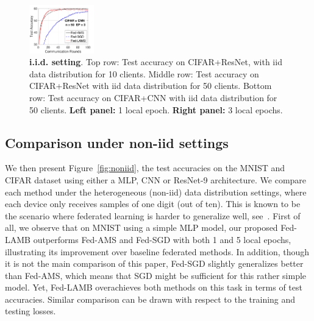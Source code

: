 \documentclass[twoside]{article}
\begin{document}
\begin{figure}[t]
\begin{center}
{        \includegraphics[width=0.25\textwidth]{new_figure/cifar_testerror_cnn_ep3_client50_iid1.pdf}

        }
    \end{center}
	\caption{\textbf{i.i.d. setting}. Top row: Test accuracy on CIFAR+ResNet, with iid data distribution for 10 clients. 
	{Middle row:} Test accuracy on CIFAR+ResNet with iid data distribution for 50 clients.
	{Bottom row:} Test accuracy on CIFAR+CNN with iid data distribution for 50 clients.
	\textbf{Left panel:} 1 local epoch. \textbf{Right panel:} 3 local epochs. 
	}
	\label{fig:iid}
\end{figure}



\subsection{Comparison under non-iid settings}

We then present Figure~\ref{fig:noniid}, the test accuracies on the MNIST and CIFAR dataset using either a MLP, CNN or ResNet-9 architecture. 
We compare each method under the heterogeneous (non-iid) data distribution settings, where each device only receives samples of one digit (out of ten). 
This is known to be the scenario where federated learning is harder to generalize well, see~\citet{mcmahan2017communication}. 
First of all, we observe that on MNIST using a simple MLP model, our proposed Fed-LAMB outperforms Fed-AMS and Fed-SGD with both 1 and 5 local epochs, illustrating its improvement over baseline federated methods. 
In addition, though it is not the main comparison of this paper, Fed-SGD slightly generalizes better than Fed-AMS, which means that SGD might be sufficient for this rather simple model. 
Yet, Fed-LAMB overachieves both methods on this task in terms of test accuracies.
Similar comparison can be drawn with respect to the training and testing losses.
\end{document}
